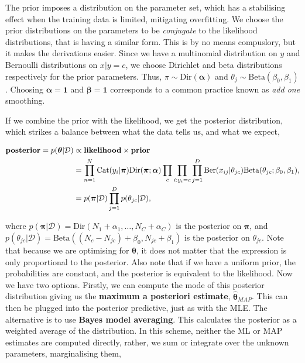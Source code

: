 \documentclass[11pt]{amsart}
\begin{document}
The prior imposes a distribution on the parameter set, which has a stabilising effect when the training data is limited, mitigating overfitting. We choose the prior distributions on the parameters to be \emph{conjugate} to the likelihood distributions, that is having a similar form. This is by no means compuslory, but it makes the derivations easier. Since we have a multinomial distribution on $y$ and Bernoulli distributions on $x|y=c$, we choose Dirichlet and beta distributions respectively for the prior parameters. Thus, $\pi \sim \text{Dir}(\boldsymbol\alpha)$ and $\theta_j \sim \text{Beta}(\beta_0, \beta_1)$. Choosing $\boldsymbol\alpha = \mathbf{1}$ and $\boldsymbol\beta = \mathbf{1}$ corresponds to a common practice known as \emph{add one} smoothing.

If we combine the prior with the likelihood, we get the posterior distribution, which strikes a balance between what the data tells us, and what we expect,

\begin{align}
\textbf{posterior} = p(\boldsymbol\theta|\mathcal{D}) &\propto \textbf{likelihood} \times \textbf{prior} \notag \\
&= \prod_{n=1}^N\text{Cat}(y_i|\boldsymbol\pi)\text{Dir}(\boldsymbol\pi;\boldsymbol\alpha)\prod_{c}\prod_{i:y_i = c}\prod_{j = 1}^D \text{Ber}(x_{ij}|\theta_{jc})\text{Beta}(\theta_{jc};\beta_0, \beta_1), \notag \\
&= p(\boldsymbol\pi|\mathcal{D})\prod_{j = 1}^D p(\theta_{jc}|\mathcal{D}), \notag
\end{align}

where $p(\boldsymbol\pi|\mathcal{D}) = \text{Dir}(N_1 + \alpha_1, \dots, N_C + \alpha_C)$ is the posterior on $\boldsymbol\pi$, and $p(\theta_{jc}|\mathcal{D}) = \text{Beta}((N_c - N_{jc}) + \beta_0, N_{jc} + \beta_1)$ is the posterior on $\theta_{jc}$. Note that because we are optimising for $\boldsymbol\theta$, it does not matter that the expression is only proportional to the posterior. Also note that if we have a uniform prior, the probabilities are constant, and the posterior is equivalent to the likelihood. Now we have two options. Firstly, we can compute the mode of this posterior distribution giving us the \textbf{maximum a posteriori estimate}, $\hat{\boldsymbol\theta}_{MAP}$. This can then be plugged into the posterior predictive, just as with the MLE. The alternative is to use \textbf{Bayes model averaging}. This calculates the posterior as a weighted average of the distribution. In this scheme, neither the ML or MAP estimates are computed directly, rather, we sum or integrate over the unknown parameters, marginalising them,
\end{document}
